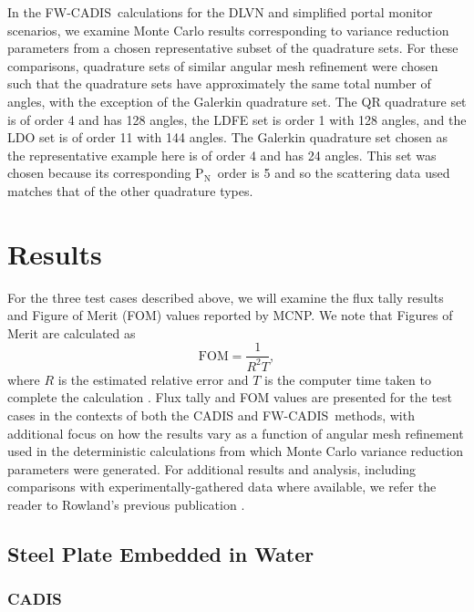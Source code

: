 \documentclass{article} %
\newcommand{\pn}{P$_\mathrm{N}$}
\newcommand{\fwc}{\mbox{FW-CADIS}}
\begin{document}
In the \fwc\ calculations for the DLVN and simplified portal monitor
scenarios, we examine Monte Carlo results corresponding to variance reduction
parameters from a chosen representative subset of the quadrature sets. For
these comparisons, quadrature sets of similar angular mesh refinement were
chosen such that the quadrature sets have approximately the same total number
of angles, with the exception of the Galerkin quadrature set. The QR
quadrature set is of order 4 and has 128 angles, the LDFE set is order 1 with
128 angles, and the LDO set is of order 11 with 144 angles. The Galerkin
quadrature set chosen as the representative example here is of order 4 and has
24 angles. This set was chosen because its corresponding \pn\ order is 5 and
so the scattering data used matches that of the other quadrature types.

\section{Results}
\label{sec:results}

For the three test cases described above, we will examine the flux
tally results and Figure of Merit (FOM) values reported by MCNP. We note that
Figures of Merit are calculated as
%
\begin{equation}
\text{FOM} = \frac{1}{R^2T},
\label{eq:fom}
\end{equation}
%
where $R$ is the estimated relative error and $T$ is the computer time taken
to complete the calculation \cite{mcnp}. Flux tally and FOM values are
presented for the test cases in the contexts of both the CADIS and
\fwc\ methods, with additional focus on how the results vary as a function of
angular mesh refinement used in the deterministic calculations from which
Monte Carlo variance reduction parameters were generated. For additional
results and analysis, including comparisons with experimentally-gathered
data where available, we refer the reader to Rowland's previous publication
\cite{kr}.

\subsection{Steel Plate Embedded in Water}

\subsubsection{CADIS}
\end{document}
